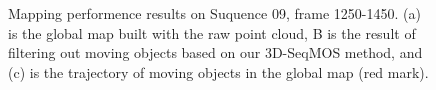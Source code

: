 \documentclass[lettersize,journal]{IEEEtran}
\begin{document}
\begin{figure}[h]
\begin{center}


\caption{Mapping performence results on Suquence 09, frame 1250-1450. (a) is the global map built with the raw point cloud, B is the result of filtering out moving objects based on our 3D-SeqMOS method, and (c) is the trajectory of moving objects in the global map (red mark).}
\label{fig10}
\end{center}
\end{figure}  
\end{document}
